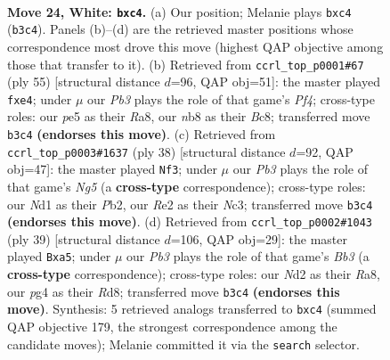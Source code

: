 \documentclass[11pt]{article}
\begin{document}
\clearpage

\begin{figure}[p]\centering
\begin{subfigure}{0.46\textwidth}\centering
\resizebox{\linewidth}{!}{%
\newchessgame
\chessboard[
  setfen={1n3rk1/r2b2b1/5n2/pP2p3/P1p1p1p1/1P4P1/3NRPB1/1RBN2K1 w - - 0 24},
  showmover=false,
  pgfstyle=straightmove, color=movearrow, markmove={b3-c4}
]}
\caption{}
\end{subfigure}\hfill
\begin{subfigure}{0.46\textwidth}\centering
\resizebox{\linewidth}{!}{%
\newchessgame
\chessboard[
  setfen={r1b1r1k1/7p/pn1p2p1/3P1p2/1Pp1PP2/1nN2NPP/R5B1/1R4K1 b - - 1 28},
  showmover=false,
  pgfstyle=straightmove, color=movearrow, markmove={f5-e4}
]}
\caption{}
\end{subfigure}
\\[4pt]
\begin{subfigure}{0.46\textwidth}\centering
\resizebox{\linewidth}{!}{%
\newchessgame
\chessboard[
  setfen={r3k3/1p2bpp1/2p1b2r/5nN1/p3RB1p/2NR3P/PPP2PP1/6K1 w - - 4 20},
  showmover=false,
  pgfstyle=straightmove, color=movearrow, markmove={g5-f3}
]}
\caption{}
\end{subfigure}\hfill
\begin{subfigure}{0.46\textwidth}\centering
\resizebox{\linewidth}{!}{%
\newchessgame
\chessboard[
  setfen={r1br2k1/1p4p1/1bn2pp1/P7/P2p4/5NP1/2PB1PBP/R3R1K1 b - - 0 20},
  showmover=false,
  pgfstyle=straightmove, color=movearrow, markmove={b6-a5}
]}
\caption{}
\end{subfigure}
\caption{\textbf{Move 24, White: \texttt{bxc4}.} (a) Our position; Melanie plays \texttt{bxc4} (\texttt{b3c4}). Panels (b)--(d) are the retrieved master positions whose correspondence most drove this move (highest QAP objective among those that transfer to it). (b) Retrieved from \texttt{ccrl\_top\_p0001\#67} (ply 55) [structural distance $d$=96, QAP obj=51]: the master played \texttt{fxe4}; under $\mu$ our \emph{Pb3} plays the role of that game's \emph{Pf4}; cross-type roles: our \emph{p}e5 as their \emph{R}a8, our \emph{n}b8 as their \emph{B}c8; transferred move \texttt{b3c4} \textbf{(endorses this move)}. (c) Retrieved from \texttt{ccrl\_top\_p0003\#1637} (ply 38) [structural distance $d$=92, QAP obj=47]: the master played \texttt{Nf3}; under $\mu$ our \emph{Pb3} plays the role of that game's \emph{Ng5} (a \textbf{cross-type} correspondence); cross-type roles: our \emph{N}d1 as their \emph{P}b2, our \emph{R}e2 as their \emph{N}c3; transferred move \texttt{b3c4} \textbf{(endorses this move)}. (d) Retrieved from \texttt{ccrl\_top\_p0002\#1043} (ply 39) [structural distance $d$=106, QAP obj=29]: the master played \texttt{Bxa5}; under $\mu$ our \emph{Pb3} plays the role of that game's \emph{Bb3} (a \textbf{cross-type} correspondence); cross-type roles: our \emph{N}d2 as their \emph{R}a8, our \emph{p}g4 as their \emph{R}d8; transferred move \texttt{b3c4} \textbf{(endorses this move)}. Synthesis: 5 retrieved analogs transferred to \texttt{bxc4} (summed QAP objective 179, the strongest correspondence among the candidate moves); Melanie committed it via the \texttt{search} selector.}
\label{fig:thought-m46}
\end{figure}
\end{document}
